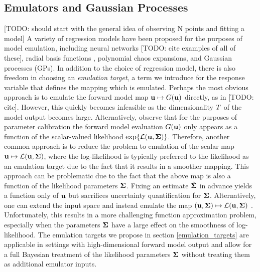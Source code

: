 \documentclass[12pt]{article}
\begin{document}
\subsection{Emulators and Gaussian Processes}
[TODO: should start with the general idea of observing N points and fitting a model]
A variety of regression models have been proposed for the purposes of model emulation, including neural networks [TODO: cite examples of all of these], 
radial basis functions \cite{doi:10.1198/106186008X320681}, polynomial chaos expansions, and Gaussian processes (GPs). In addition to the choice of regression model, there is also freedom in 
choosing an \textit{emulation target}, a term we introduce for the response variable that defines the mapping which is emulated. Perhaps the most obvious approach is 
to emulate the forward model map $\mathbf{u} \mapsto G(\mathbf{u})$ directly, as in [TODO: cite]. However, this quickly becomes infeasible as the dimensionality 
$T$ of the model output becomes large. Alternatively, observe that for the purposes of parameter calibration the forward model evaluation $G(\mathbf{u})$ 
only appears as a function of the scalar-valued likelihood $\exp\mathopen{}\left\{\mathcal{L}(\mathbf{u}, \boldsymbol{\Sigma})\right\}\mathclose{}$. Therefore, another common approach is to reduce the problem to 
emulation of the scalar map $\mathbf{u} \mapsto \mathcal{L}(\mathbf{u}, \boldsymbol{\Sigma})$, where the log-likelihood is typically preferred to the likelihood as an emulation target due to 
the fact that it results in a smoother mapping. This approach can be problematic due to the fact that the above map is also a function of the likelihood parameters 
$\boldsymbol{\Sigma}$. Fixing an estimate $\hat{\boldsymbol{\Sigma}}$ in advance yields a function only of $\mathbf{u}$ but sacrifices uncertainty quantification for $\boldsymbol{\Sigma}$. Alternatively, 
one can extend the input space and instead emulate the map $(\mathbf{u}, \boldsymbol{\Sigma}) \mapsto \mathcal{L}(\mathbf{u}, \boldsymbol{\Sigma})$ 
\cite{doi:10.1198/106186008X320681, LEBEL2019158}. Unfortunately, this results in a more challenging function approximation problem, especially when 
the parameters $\boldsymbol{\Sigma}$ have a large effect on the smoothness of log-likelihood. The emulation targets we propose in section \ref{emulation_targets} are 
applicable in settings with high-dimensional forward model output and allow for a full Bayesian treatment of the likelihood parameters $\boldsymbol{\Sigma}$ without 
treating them as additional emulator inputs. 
\end{document}
